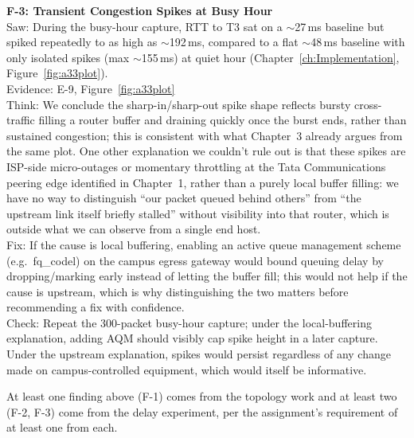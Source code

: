 \textbf{F-3: Transient Congestion Spikes at Busy Hour}\\
Saw: During the busy-hour capture, RTT to T3 sat on a $\sim$27\,ms baseline but spiked
repeatedly to as high as $\sim$192\,ms, compared to a flat $\sim$48\,ms baseline with only
isolated spikes (max $\sim$155\,ms) at quiet hour (Chapter~\ref{ch:Implementation},
Figure~\ref{fig:a33plot}).\\
Evidence: E-9, Figure~\ref{fig:a33plot}\\
Think: We conclude the sharp-in/sharp-out spike shape reflects bursty cross-traffic filling a
router buffer and draining quickly once the burst ends, rather than sustained congestion; this
is consistent with what Chapter~3 already argues from the same plot. One other explanation we
couldn't rule out is that these spikes are ISP-side micro-outages or momentary throttling at the
Tata Communications peering edge identified in Chapter~1, rather than a purely local buffer
filling: we have no way to distinguish ``our packet queued behind others'' from ``the upstream
link itself briefly stalled'' without visibility into that router, which is outside what we can
observe from a single end host.\\
Fix: If the cause is local buffering, enabling an active queue management scheme (e.g.\
fq\_codel) on the campus egress gateway would bound queuing delay by dropping/marking early
instead of letting the buffer fill; this would not help if the cause is upstream, which is why
distinguishing the two matters before recommending a fix with confidence.\\
Check: Repeat the 300-packet busy-hour capture; under the local-buffering explanation, adding
AQM should visibly cap spike height in a later capture. Under the upstream explanation, spikes
would persist regardless of any change made on campus-controlled equipment, which would itself
be informative.

\vspace{1em}
\noindent At least one finding above (F-1) comes from the topology work and at least two
(F-2, F-3) come from the delay experiment, per the assignment's requirement of at least one
from each.
